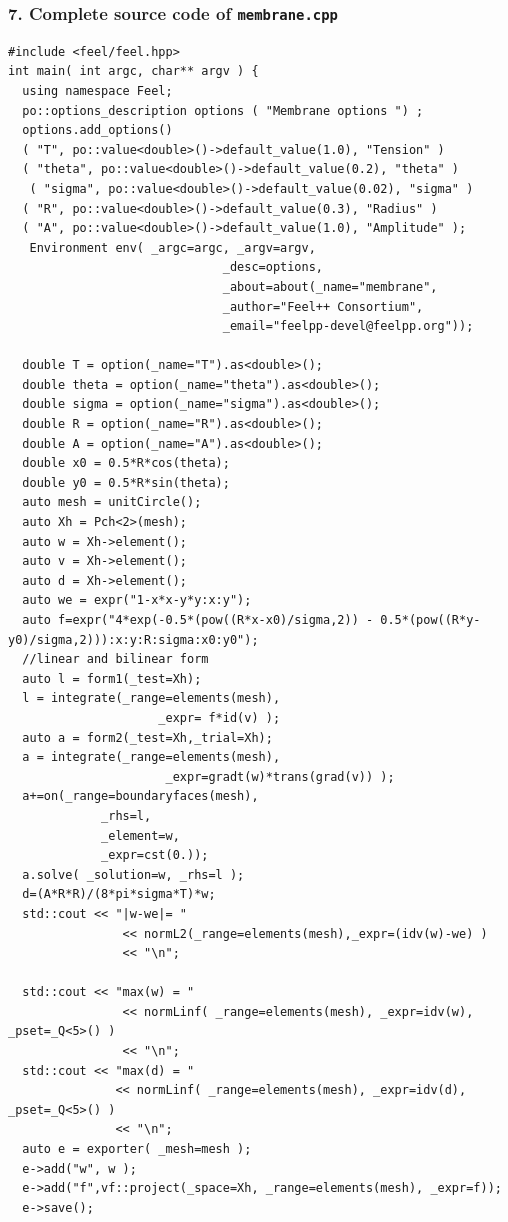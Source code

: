 \documentclass[a4paper,oneside,10pt]{report}
\begin{document}
\subsubsection{7. Complete source code of \texttt{membrane.cpp}}
\begin{center}
\begin{minipage}{\textwidth}
\begin{lstlisting}[label=code2,caption=membrane.cpp]
#include <feel/feel.hpp>
int main( int argc, char** argv ) {
  using namespace Feel;
  po::options_description options ( "Membrane options ") ;
  options.add_options()
  ( "T", po::value<double>()->default_value(1.0), "Tension" )
  ( "theta", po::value<double>()->default_value(0.2), "theta" )
   ( "sigma", po::value<double>()->default_value(0.02), "sigma" )
  ( "R", po::value<double>()->default_value(0.3), "Radius" )
  ( "A", po::value<double>()->default_value(1.0), "Amplitude" );
   Environment env( _argc=argc, _argv=argv,
                              _desc=options,
                              _about=about(_name="membrane",
                              _author="Feel++ Consortium",
                              _email="feelpp-devel@feelpp.org"));
                            
  double T = option(_name="T").as<double>();
  double theta = option(_name="theta").as<double>(); 
  double sigma = option(_name="sigma").as<double>();
  double R = option(_name="R").as<double>();
  double A = option(_name="A").as<double>();
  double x0 = 0.5*R*cos(theta);
  double y0 = 0.5*R*sin(theta);
  auto mesh = unitCircle();
  auto Xh = Pch<2>(mesh);
  auto w = Xh->element();
  auto v = Xh->element();
  auto d = Xh->element();
  auto we = expr("1-x*x-y*y:x:y");
  auto f=expr("4*exp(-0.5*(pow((R*x-x0)/sigma,2)) - 0.5*(pow((R*y-y0)/sigma,2))):x:y:R:sigma:x0:y0"); 
  //linear and bilinear form
  auto l = form1(_test=Xh);
  l = integrate(_range=elements(mesh),
                     _expr= f*id(v) );
  auto a = form2(_test=Xh,_trial=Xh);
  a = integrate(_range=elements(mesh),
                      _expr=gradt(w)*trans(grad(v)) );
  a+=on(_range=boundaryfaces(mesh),
             _rhs=l, 
             _element=w, 
             _expr=cst(0.));
  a.solve( _solution=w, _rhs=l );
  d=(A*R*R)/(8*pi*sigma*T)*w;
  std::cout << "|w-we|= "
                << normL2(_range=elements(mesh),_expr=(idv(w)-we) )
                << "\n";

  std::cout << "max(w) = "
                << normLinf( _range=elements(mesh), _expr=idv(w), _pset=_Q<5>() )
                << "\n";
  std::cout << "max(d) = "
               << normLinf( _range=elements(mesh), _expr=idv(d), _pset=_Q<5>() )
               << "\n";          
  auto e = exporter( _mesh=mesh ); 
  e->add("w", w );
  e->add("f",vf::project(_space=Xh, _range=elements(mesh), _expr=f));
  e->save();
 \end{lstlisting}
\end{minipage}
\end{center}
\end{document}
